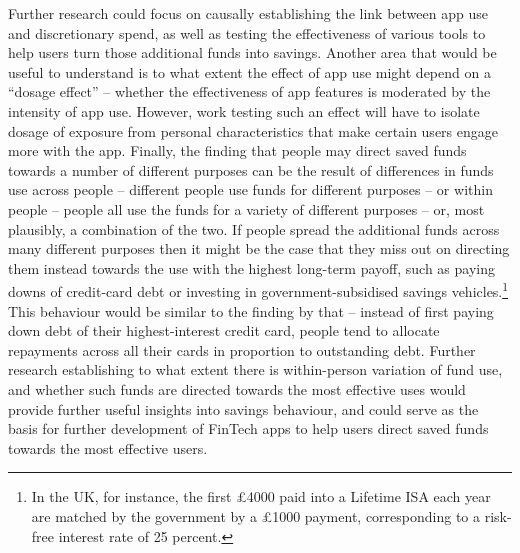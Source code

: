 Further research could focus on causally establishing the link between app use
and discretionary spend, as well as testing the effectiveness of various tools
to help users turn those additional funds into savings. Another area that would
be useful to understand is to what extent the effect of app use might depend on
a ``dosage effect'' -- whether the effectiveness of app features is moderated
by the intensity of app use. However, work testing such an effect will have to
isolate dosage of exposure from personal characteristics that make certain
users engage more with the app. Finally, the finding that people may direct
saved funds towards a number of different purposes can be the result of
differences in funds use across people -- different people use funds for
different purposes -- or within people -- people all use the funds for a
variety of different purposes -- or, most plausibly, a combination of the two.
If people spread the additional funds across many different purposes then it
might be the case that they miss out on directing them instead towards the use
with the highest long-term payoff, such as paying downs of credit-card debt or
investing in government-subsidised savings vehicles.\footnote{In the UK, for
  instance, the first £4000 paid into a Lifetime ISA each year are matched by
  the government by a £1000 payment, corresponding to a risk-free interest rate
of 25 percent.} This behaviour would be similar to the finding by
\citet{gathergood2019individual} that -- instead of first paying down debt of
their highest-interest credit card, people tend to allocate repayments across
all their cards in proportion to outstanding debt. Further research
establishing to what extent there is within-person variation of fund use, and
whether such funds are directed towards the most effective uses would provide
further useful insights into savings behaviour, and could serve as the basis
for further development of FinTech apps to help users direct saved funds
towards the most effective users.

